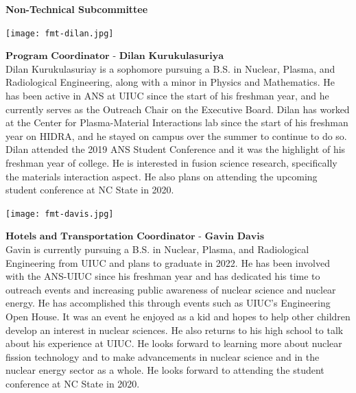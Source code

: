 \vspace{1cm}
\textbf{Non-Technical Subcommittee}\\

\begin{minipage}{0.25\textwidth}
	\centering
	\texttt{[image: fmt-dilan.jpg]}
\end{minipage}
\begin{minipage}{0.73\textwidth}
	$\textbf{Program Coordinator - Dilan Kurukulasuriya}$\\
Dilan Kurukulasuriay is a sophomore pursuing a B.S. in Nuclear, Plasma, and Radiological Engineering, along with a minor in Physics and Mathematics. He has been active in ANS at UIUC since the start of his freshman year, and he currently serves as the Outreach Chair on the Executive Board. Dilan has worked at the Center for Plasma-Material Interactions lab since the start of his freshman year on HIDRA, and he stayed on campus over the summer to continue to do so. Dilan attended the 2019 ANS Student Conference and it was the highlight of his freshman year of college. He is interested in fusion science research, specifically the materials interaction aspect. He also plans on attending the upcoming student conference at NC State in 2020.
\end{minipage}

\begin{minipage}{0.25\textwidth}
	\centering
	\texttt{[image: fmt-davis.jpg]}
\end{minipage}
\begin{minipage}{0.73\textwidth}
$\textbf{Hotels and Transportation Coordinator - Gavin Davis}$\\
	Gavin is currently pursuing a B.S. in Nuclear, Plasma, and Radiological Engineering from UIUC and plans to graduate in 2022. He has been involved with the ANS-UIUC since his freshman year and has dedicated his time to outreach events and increasing public awareness of nuclear science and nuclear energy. He has accomplished this through events such as UIUC's Engineering Open House. It was an event he enjoyed as a kid and hopes to help other children develop an interest in nuclear sciences. He also returns to his high school to talk about his experience at UIUC. He looks forward to learning more about nuclear fission technology and to make advancements in nuclear science and in the nuclear energy sector as a whole. He looks forward to attending the student conference at NC State in 2020.
\end{minipage}

